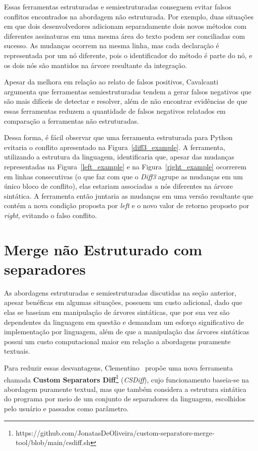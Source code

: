 Essas ferramentas estruturadas e semiestruturadas conseguem evitar falsos
conflitos encontrados na abordagem não estruturada. Por exemplo, duas situações
em que dois desenvolvedores adicionam separadamente dois novos métodos com
diferentes assinaturas em uma mesma área do texto podem ser conciliadas com
sucesso. As mudanças ocorrem na mesma linha, mas cada declaração é representada
por um nó diferente, pois o identificador do método é parte do nó, e os dois
nós são mantidos na árvore resultante da integração.

Apesar da melhora em relação ao relato de falsos positivos,
Cavalcanti~\cite{cavalcanti17} argumenta que ferramentas semiestruturadas tendem
a gerar falsos negativos que são mais difíceis de detectar e resolver, além de
não encontrar evidências de que essas ferramentas reduzem a quantidade de
falsos negativos relatados em comparação a ferramentas não estruturadas.

Dessa forma, é fácil observar que uma ferramenta estruturada para Python
evitaria o conflito apresentado na Figura~\ref{diff3_example}. A ferramenta,
utilizando a estrutura da linguagem, identificaria que, apesar das mudanças
representadas na Figura~\ref{left_example} e na Figura~\ref{right_example}
ocorrerem em linhas consecutivas (o que faz com que o \emph{Diff3} agrupe as
mudanças em um único bloco de conflito), elas estariam associadas a nós
diferentes na árvore sintática. A ferramenta então juntaria as mudanças em uma
versão resultante que contém a nova condição proposta por \emph{left} e o novo
valor de retorno proposto por \emph{right}, evitando o falso conflito.

\section{Merge não Estruturado com separadores}

As abordagens estruturadas e semiestruturadas discutidas na seção anterior,
apesar benéficas em algumas situações, possuem um custo adicional, dado que elas se
baseiam em manipulação de árvores sintáticas, que por sua vez são dependentes
da linguagem em questão e demandam um esforço significativo de implementação
por linguagem, além de que a manipulação das árvores sintáticas possui um custo
computacional maior em relação a abordagens puramente textuais.

Para reduzir essas desvantagens, Clementino~\cite{clem21} propôe uma nova
ferramenta chamada \textbf{Custom Separators
	Diff}\footnote{https://github.com/JonatasDeOliveira/custom-separators-merge-tool/blob/main/csdiff.sh}
(\emph{CSDiff}), cujo funcionamento baseia-se na abordagem puramente textual,
mas que também considera a estrutura sintática do programa por meio de um
conjunto de separadores da linguagem, escolhidos pelo usuário e passados como
parâmetro.

